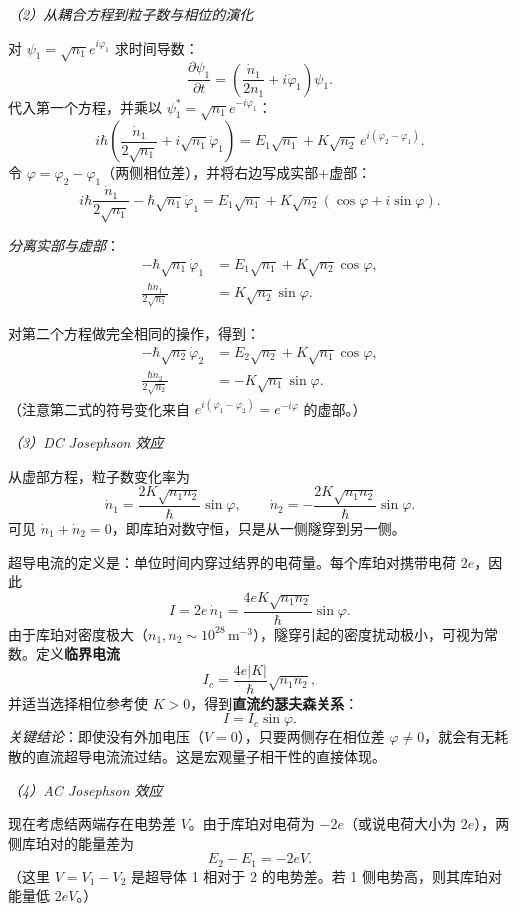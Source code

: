 \textit{（2）从耦合方程到粒子数与相位的演化}

对 $\psi_1 = \sqrt{n_1}e^{i\varphi_1}$ 求时间导数：
\[
\frac{\partial\psi_1}{\partial t} = \left( \frac{\dot{n}_1}{2n_1} + i\dot{\varphi}_1 \right)\psi_1.
\]
代入第一个方程，并乘以 $\psi_1^* = \sqrt{n_1}e^{-i\varphi_1}$：
\[
i\hbar\left( \frac{\dot{n}_1}{2\sqrt{n_1}} + i\sqrt{n_1}\dot{\varphi}_1 \right) = E_1\sqrt{n_1} + K\sqrt{n_2}\,e^{i(\varphi_2-\varphi_1)}.
\]
令 $\varphi = \varphi_2 - \varphi_1$（两侧相位差），并将右边写成实部+虚部：
\[
i\hbar\frac{\dot{n}_1}{2\sqrt{n_1}} - \hbar\sqrt{n_1}\dot{\varphi}_1 = E_1\sqrt{n_1} + K\sqrt{n_2}(\cos\varphi + i\sin\varphi).
\]

\textit{分离实部与虚部}：
\begin{align*}
-\hbar\sqrt{n_1}\dot{\varphi}_1 &= E_1\sqrt{n_1} + K\sqrt{n_2}\cos\varphi, \tag{实部} \\
\frac{\hbar\dot{n}_1}{2\sqrt{n_1}} &= K\sqrt{n_2}\sin\varphi. \tag{虚部}
\end{align*}

对第二个方程做完全相同的操作，得到：
\begin{align*}
-\hbar\sqrt{n_2}\dot{\varphi}_2 &= E_2\sqrt{n_2} + K\sqrt{n_1}\cos\varphi, \tag{实部$'$} \\
\frac{\hbar\dot{n}_2}{2\sqrt{n_2}} &= -K\sqrt{n_1}\sin\varphi. \tag{虚部$'$}
\end{align*}
（注意第二式的符号变化来自 $e^{i(\varphi_1-\varphi_2)} = e^{-i\varphi}$ 的虚部。）

\textit{（3）DC Josephson 效应}

从虚部方程，粒子数变化率为
\[
\dot{n}_1 = \frac{2K\sqrt{n_1 n_2}}{\hbar}\sin\varphi, \qquad
\dot{n}_2 = -\frac{2K\sqrt{n_1 n_2}}{\hbar}\sin\varphi.
\]
可见 $\dot{n}_1 + \dot{n}_2 = 0$，即库珀对数守恒，只是从一侧隧穿到另一侧。

超导电流的定义是：单位时间内穿过结界的电荷量。每个库珀对携带电荷 $2e$，因此
\[
I = 2e\,\dot{n}_1 = \frac{4eK\sqrt{n_1 n_2}}{\hbar}\sin\varphi.
\]
由于库珀对密度极大（$n_1, n_2 \sim 10^{28}\,\text{m}^{-3}$），隧穿引起的密度扰动极小，可视为常数。定义\textbf{临界电流}
\[
I_c = \frac{4e|K|}{\hbar}\sqrt{n_1 n_2},
\]
并适当选择相位参考使 $K>0$，得到\textbf{直流约瑟夫森关系}：
\[
\boxed{I = I_c \sin\varphi}.
\]
\textit{关键结论}：即使没有外加电压（$V=0$），只要两侧存在相位差 $\varphi \neq 0$，就会有无耗散的直流超导电流流过结。这是宏观量子相干性的直接体现。

\textit{（4）AC Josephson 效应}

现在考虑结两端存在电势差 $V$。由于库珀对电荷为 $-2e$（或说电荷大小为 $2e$），两侧库珀对的能量差为
\[
E_2 - E_1 = -2eV.
\]
（这里 $V = V_1 - V_2$ 是超导体 1 相对于 2 的电势差。若 1 侧电势高，则其库珀对能量低 $2eV$。）

